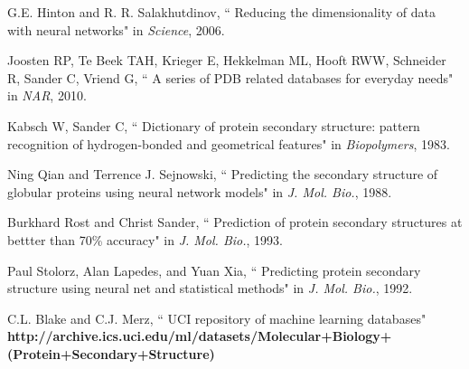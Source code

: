 \documentclass[letterpaper,twocolumn,12pt]{article}
\begin{document}
\begin{thebibliography}{9}


G.E. Hinton and R. R. Salakhutdinov,
   `` Reducing the dimensionality of data with neural networks"
   in \emph{Science}, 2006.

Joosten RP, Te Beek TAH, Krieger E, Hekkelman ML, Hooft RWW, Schneider R, Sander C, Vriend G,
   `` A series of PDB related databases for everyday needs"
   in \emph{NAR}, 2010.

Kabsch W, Sander C,
   `` Dictionary of protein secondary structure: pattern recognition of hydrogen-bonded and geometrical features"
   in \emph{Biopolymers}, 1983.

Ning Qian and Terrence J. Sejnowski,
  `` Predicting the secondary structure of globular proteins using neural network models"
  in \emph{J. Mol. Bio.}, 1988.

Burkhard Rost and Christ Sander,
  `` Prediction of protein secondary structures at bettter than 70\% accuracy"
  in \emph{J. Mol. Bio.}, 1993.

Paul Stolorz, Alan Lapedes, and Yuan Xia,
   `` Predicting protein secondary structure using neural net and statistical methods"
   in \emph{J. Mol. Bio.}, 1992.

   C.L. Blake and C.J. Merz,
   `` UCI repository of machine learning databases"
   \textbf{http://archive.ics.uci.edu/ml/datasets/Molecular+Biology+(Protein+Secondary+Structure)}

\end{thebibliography}
\end{document}
